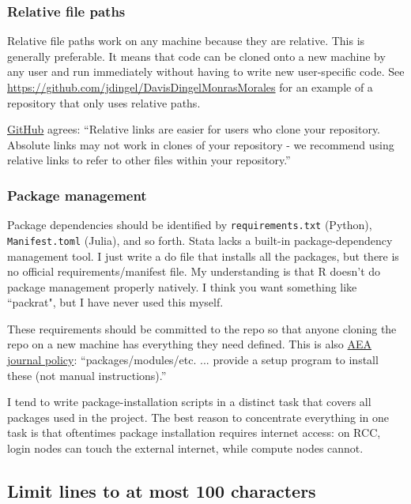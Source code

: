 \subsubsection{Relative file paths}

Relative file paths work on any machine because they are relative.
This is generally preferable.
It means that code can be cloned onto a new machine by any user and run immediately without having to write new user-specific code.
See \url{https://github.com/jdingel/DavisDingelMonrasMorales} for an example of a repository that only uses relative paths.

\href{https://help.github.com/articles/about-readmes/\#relative-links-and-image-paths-in-readme-files}{GitHub} agrees:
``Relative links are easier for users who clone your repository. Absolute links may not work in clones of your repository - we recommend using relative links to refer to other files within your repository.''

\subsubsection{Package management}

Package dependencies should be identified by \texttt{requirements.txt} (Python), \texttt{Manifest.toml} (Julia), and so forth.
Stata lacks a built-in package-dependency management tool.
I just write a do file that installs all the packages, but there is no official requirements/manifest file.
My understanding is that R doesn't do package management properly natively.
I think you want something like ``packrat", but I have never used this myself.

These requirements should be committed to the repo so that anyone cloning the repo on a new machine has everything they need defined.
This is also \href{https://aeadataeditor.github.io/aea-de-guidance/preparing-for-data-deposit.html}{AEA journal policy}:
``packages/modules/etc. ... provide a setup program to install these (not manual instructions).''

I tend to write package-installation scripts in a distinct task that covers all packages used in the project.
The best reason to concentrate everything in one task is that oftentimes package installation requires internet access:
on RCC, login nodes can touch the external internet, while compute nodes cannot.

\subsection{Limit lines to at most 100 characters}

